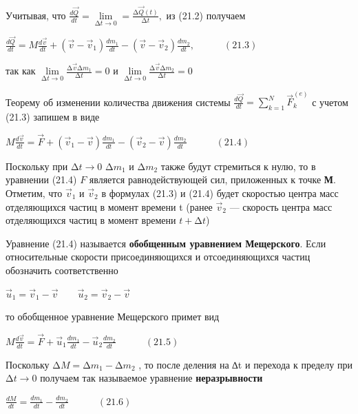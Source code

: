 {\begin{center}
\par Учитывая, что $\frac{d\vec{Q}}{dt} = \lim\limits_{∆t \rightarrow 0} = \frac{∆\vec{Q}(t)}{∆t},$ из (21.2) получаем

\par $\frac{d\vec{Q}}{dt} = M \frac{d\vec{v}}{dt} + (\vec{v} - \vec{v}_1) \frac{d m_1}{dt} - (\vec{v} - \vec{v}_2) \frac{d m_2}{dt}, \quad\quad\quad (21.3)$

\par так как $\lim\limits_{∆t \rightarrow 0} \frac{∆ \vec{v} ∆m_1}{∆t} = 0$ и $\lim\limits_{∆t \rightarrow 0} \frac{∆ \vec{v} ∆m_2}{∆t} = 0$

\par Теорему об изменении количества движения системы $\frac{d\vec{Q}}{dt} = \sum\limits_{k=1}^N \vec{F}_k^{(e)}$ с учетом (21.3) запишем в виде

\par $ M \frac{d\vec{v}}{dt} = \vec{F} + (\vec{v}_1 - \vec{v}) \frac{d m_1}{dt} - (\vec{v}_2 - \vec{v}) \frac{d m_2}{dt} \quad\quad\quad (21.4)$

\par Поскольку при $∆t→0$  $∆m_1$ и $∆m_2$ также  будут  стремиться к  нулю,  то в уравнении (21.4) $F$ является равнодействующей сил, приложенных к точке \textbf{М}. Отметим, что $\vec{v}_1$ и $\vec{v}_2$ в формулах (21.3) и (21.4) будет скоростью центра масс отделяющихся частиц в момент времени t (ранее $\vec{v}_2$ — скорость центра масс отделяющихся частиц в момент времени $t+∆t$)

\par Уравнение  (21.4)  называется  \textbf{обобщенным  уравнением  Мещерского}.  Если  относительные  скорости  присоединяющихся  и  отсоединяющихся  частиц обозначить соответственно

\par $\vec{u}_1 = \vec{v}_1 - \vec{v} \quad\quad \vec{u}_2 = \vec{v}_2 - \vec{v}$

\par то обобщенное уравнение Мещерского примет вид

\par $ M \frac{d\vec{v}}{dt} = \vec{F} + \vec{u}_1 \frac{d m_1}{dt} - \vec{u}_2 \frac{d m_2}{dt} \quad\quad\quad (21.5)$

\par Поскольку $∆M = ∆m_1 - ∆m_2$ , то после деления на ∆t  и перехода к пределу при $∆t→0$  получаем так называемое уравнение \textbf{неразрывности}

\par $\frac{dM}{dt} = \frac{dm_1}{dt} - \frac{dm_2}{dt} \quad\quad\quad (21.6)$


\end{center}}
